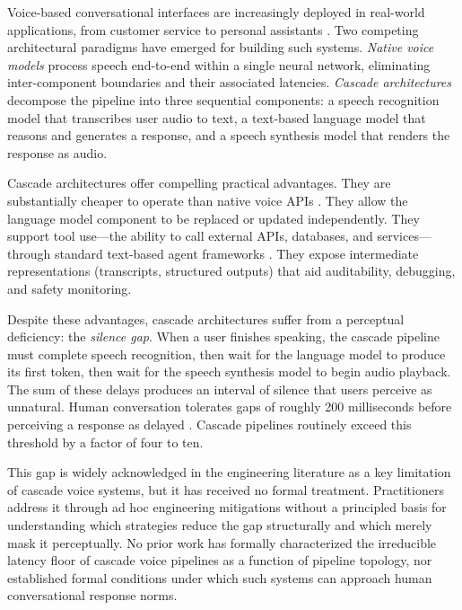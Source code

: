 Voice-based conversational interfaces are increasingly deployed in real-world applications,
from customer service \citep{openai2024realtimeapi} to personal assistants \citep{google2024geminivoice}.
Two competing architectural paradigms have emerged for building such systems.
\emph{Native voice models} process speech end-to-end within a single neural network,
eliminating inter-component boundaries and their associated latencies.
\emph{Cascade architectures} decompose the pipeline into three sequential components:
a speech recognition model that transcribes user audio to text,
a text-based language model that reasons and generates a response,
and a speech synthesis model that renders the response as audio.

Cascade architectures offer compelling practical advantages.
They are substantially cheaper to operate than native voice APIs \citep{openai2024realtimeapi}.
They allow the language model component to be replaced or updated independently.
They support tool use---the ability to call external APIs, databases, and services---through
standard text-based agent frameworks \citep{yao2023react,langgraph2024}.
They expose intermediate representations (transcripts, structured outputs) that aid
auditability, debugging, and safety monitoring.

Despite these advantages, cascade architectures suffer from a perceptual deficiency:
the \emph{silence gap}.
When a user finishes speaking, the cascade pipeline must complete speech recognition,
then wait for the language model to produce its first token,
then wait for the speech synthesis model to begin audio playback.
The sum of these delays produces an interval of silence that users perceive as unnatural.
Human conversation tolerates gaps of roughly 200 milliseconds before perceiving a response
as delayed \citep{levinson2015timing,stivers2009universals}.
Cascade pipelines routinely exceed this threshold by a factor of four to ten.

This gap is widely acknowledged in the engineering literature as a key limitation of cascade
voice systems, but it has received no formal treatment.
Practitioners address it through ad hoc engineering mitigations without a principled basis
for understanding which strategies reduce the gap structurally and which merely mask it
perceptually.
No prior work has formally characterized the irreducible latency floor of cascade voice pipelines as a function of pipeline topology, nor established formal conditions under which such systems can approach human conversational response norms.


